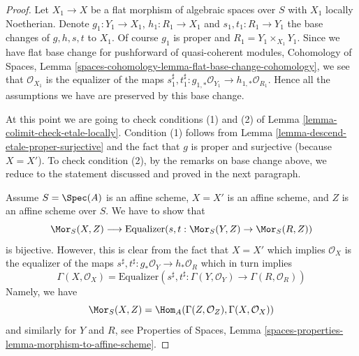 \begin{proof}
\medskip\noindent
Let $X_1 \to X$ be a flat morphism of algebraic spaces over $S$ with $X_1$
locally Noetherian. Denote $g_1 : Y_1 \to X_1$, $h_1 : R_1 \to X_1$ and
$s_1, t_1 : R_1 \to Y_1$ the base changes of $g, h, s, t$ to $X_1$.
Of course $g_1$ is proper and $R_1 = Y_1 \times_{X_1} Y_1$.
Since we have flat base change for pushforward of quasi-coherent modules,
Cohomology of Spaces, Lemma
\ref{spaces-cohomology-lemma-flat-base-change-cohomology}, we see that
$\mathcal{O}_{X_1}$ is the equalizer of the maps
$s_1^\sharp, t_1^\sharp : g_{1, *}\mathcal{O}_{Y_1} \to
h_{1, *}\mathcal{O}_{R_1}$. Hence all the assumptions we have
are preserved by this base change.

\medskip\noindent
At this point we are going to check conditions (1) and (2) of
Lemma \ref{lemma-colimit-check-etale-locally}. Condition (1)
follows from Lemma \ref{lemma-descend-etale-proper-surjective}
and the fact that $g$ is proper and surjective (because $X = X'$).
To check condition (2), by the remarks on base change above,
we reduce to the statement discussed and proved in the next paragraph.

\medskip\noindent
Assume $S = \Spec(A)$ is an affine scheme, $X = X'$ is an affine scheme, and
$Z$ is an affine scheme over $S$. We have to show that
$$
\Mor_S(X, Z) \longrightarrow
\text{Equalizer}(s, t : \Mor_S(Y, Z) \to \Mor_S(R, Z))
$$
is bijective. However, this is clear from the fact that $X = X'$
which implies $\mathcal{O}_X$ is the equalizer of the maps
$s^\sharp, t^\sharp : g_*\mathcal{O}_Y \to h_*\mathcal{O}_R$
which in turn implies
$$
\Gamma(X, \mathcal{O}_X) =
\text{Equalizer}\left(
s^\sharp, t^\sharp : \Gamma(Y, \mathcal{O}_Y) \to
\Gamma(R, \mathcal{O}_R)
\right)
$$
Namely, we have
$$
\Mor_S(X, Z) = \Hom_A(\Gamma(Z, \mathcal{O}_Z), \Gamma(X, \mathcal{O}_X))
$$
and similarly for $Y$ and $R$, see Properties of Spaces, Lemma
\ref{spaces-properties-lemma-morphism-to-affine-scheme}.
\end{proof}
